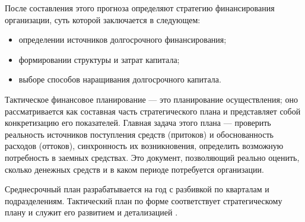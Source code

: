 После составления этого прогноза определяют стратегию финансирования организации, суть которой заключается в следующем:
\begin{itemize}
	\item определении источников долгосрочного финансирования;
	\item формировании структуры и затрат капитала;
	\item выборе способов наращивания долгосрочного капитала.
\end{itemize}

Тактическое финансовое планирование --- это планирование осуществления; оно рассматривается как составная часть стратегического плана и представляет собой конкретизацию его показателей.
Главная задача этого плана --- проверить реальность источников поступления средств (притоков) и обоснованность расходов (оттоков), синхронность их возникновения, определить возможную потребность в заемных средствах.
Это документ, позволяющий реально оценить, сколько денежных средств и в каком периоде потребуется организации.

Среднесрочный план разрабатывается на год с разбивкой по кварталам и подразделениям.
Тактический план по форме соответствует стратегическому плану и служит его развитием и детализацией \cite[179]{kirichenko}.

